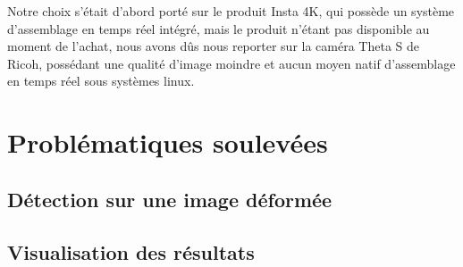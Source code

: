 			Notre choix s'était d'abord porté sur le produit Insta 4K\cite{insta360}, qui possède un système d'assemblage en temps réel intégré, mais le produit n'étant pas disponible au moment de l'achat, nous avons dûs nous reporter sur la caméra Theta S de Ricoh\cite{ricohthetas}, possédant une qualité d'image moindre et aucun moyen natif d'assemblage en temps réel sous systèmes linux.

	\section{Problématiques soulevées}

		\subsection{Détection sur une image déformée}


		\subsection{Visualisation des résultats}

		
			
